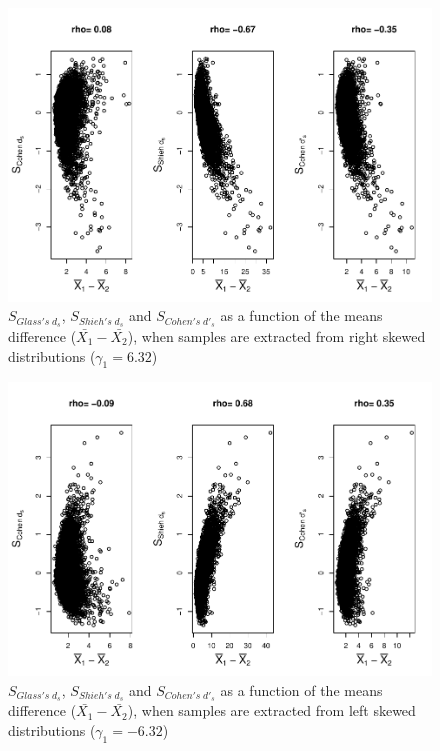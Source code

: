 \documentclass[
  man]{apa6}
\begin{document}
\begin{figure}
\centering
\includegraphics{Correlations-between-the-sample-means-difference-and-standardizers-of-all-estimators,-and-implications-on-biases-and-variances-of-all-estimators_files/figure-latex/pltStdzrHomunbalRskew-1.pdf}
\caption{\label{fig:pltStdzrHomunbalRskew}\(S_{Glass's \; d_s}\), \(S_{Shieh's \; d_s}\) and \(S_{Cohen's \; d'_s}\) as a function of the means difference (\(\bar{X_1}-\bar{X_2}\)), when samples are extracted from right skewed distributions (\(\gamma_1 = 6.32\))}
\end{figure}

\begin{figure}
\centering
\includegraphics{Correlations-between-the-sample-means-difference-and-standardizers-of-all-estimators,-and-implications-on-biases-and-variances-of-all-estimators_files/figure-latex/pltStdzrHomunbalLskew-1.pdf}
\caption{\label{fig:pltStdzrHomunbalLskew}\(S_{Glass's \; d_s}\), \(S_{Shieh's \; d_s}\) and \(S_{Cohen's \; d'_s}\) as a function of the means difference (\(\bar{X_1}-\bar{X_2}\)), when samples are extracted from left skewed distributions (\(\gamma_1 = -6.32\))}
\end{figure}
\end{document}
